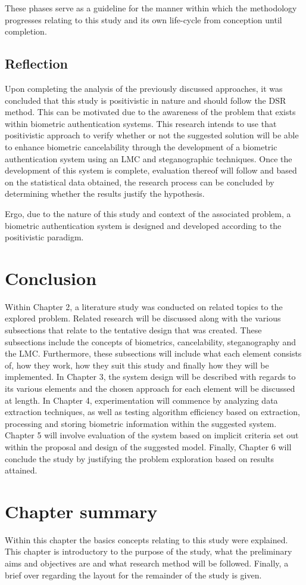 These phases serve as a guideline for the manner within which the methodology progresses relating to this study and its own life-cycle from conception until completion. 

\subsection{Reflection}
Upon completing the analysis of the previously discussed approaches, it was concluded that this study is positivistic in nature and should follow the DSR method. This can be motivated due to the awareness of the problem that exists within biometric authentication systems. This research intends to use that positivistic approach to verify whether or not the suggested solution will be able to enhance biometric cancelability through the development of a biometric authentication system using an LMC and steganographic techniques. Once the development of this system is complete, evaluation thereof will follow and based on the statistical data obtained, the research process can be concluded by determining whether the results justify the hypothesis.

Ergo, due to the nature of this study and context of the associated problem, a biometric authentication system is designed and developed according to the positivistic paradigm.

\section{Conclusion}  %
\label{section1.6}
Within Chapter 2, a literature study was conducted on related topics to the explored problem. Related research will be discussed along with the various subsections that relate to the tentative design that was created. These subsections include the concepts of biometrics, cancelability, steganography and the LMC. Furthermore, these subsections will include what each element consists of, how they work, how they suit this study and finally how they will be implemented.
In Chapter 3, the system design will be described with regards to its various elements and the chosen approach for each element will be discussed at length.
In Chapter 4, experimentation will commence by analyzing data extraction techniques, as well as testing algorithm efficiency based on extraction, processing and storing biometric information within the suggested system.
Chapter 5 will involve evaluation of the system based on implicit criteria set out within the proposal and design of the suggested model.
Finally, Chapter 6 will conclude the study by justifying the problem exploration based on results attained.

\section{Chapter summary}
\label{section1.7}
Within this chapter the basics concepts relating to this study were explained. This chapter is introductory to the purpose of the study, what the preliminary aims and objectives are and what research method will be followed. Finally, a brief over regarding the layout for the remainder of the study is given.
